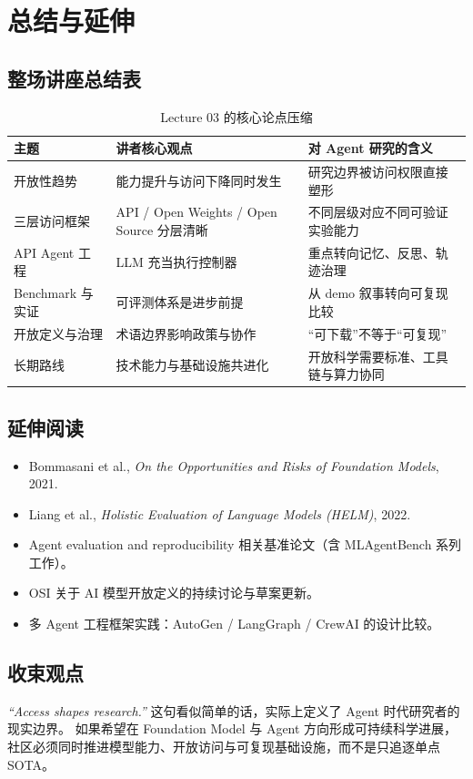 \section{总结与延伸}

\subsection{整场讲座总结表}
\begin{table}[H]
\centering
\begin{tabular}{p{2.8cm}p{4.1cm}p{4.6cm}}
\toprule
\textbf{主题} & \textbf{讲者核心观点} & \textbf{对 Agent 研究的含义} \\
\midrule
开放性趋势 & 能力提升与访问下降同时发生 & 研究边界被访问权限直接塑形 \\
三层访问框架 & API / Open Weights / Open Source 分层清晰 & 不同层级对应不同可验证实验能力 \\
API Agent 工程 & LLM 充当执行控制器 & 重点转向记忆、反思、轨迹治理 \\
Benchmark 与实证 & 可评测体系是进步前提 & 从 demo 叙事转向可复现比较 \\
开放定义与治理 & 术语边界影响政策与协作 & “可下载”不等于“可复现” \\
长期路线 & 技术能力与基础设施共进化 & 开放科学需要标准、工具链与算力协同 \\
\bottomrule
\end{tabular}
\caption{Lecture 03 的核心论点压缩}
\end{table}

\subsection{延伸阅读}
\begin{itemize}
    \item Bommasani et al., \textit{On the Opportunities and Risks of Foundation Models}, 2021.
    \item Liang et al., \textit{Holistic Evaluation of Language Models (HELM)}, 2022.
    \item Agent evaluation and reproducibility 相关基准论文（含 MLAgentBench 系列工作）。
    \item OSI 关于 AI 模型开放定义的持续讨论与草案更新。
    \item 多 Agent 工程框架实践：AutoGen / LangGraph / CrewAI 的设计比较。
\end{itemize}

\subsection{收束观点}
\textit{``Access shapes research.''} 这句看似简单的话，实际上定义了 Agent 时代研究者的现实边界。  
如果希望在 Foundation Model 与 Agent 方向形成可持续科学进展，社区必须同时推进模型能力、开放访问与可复现基础设施，而不是只追逐单点 SOTA。



